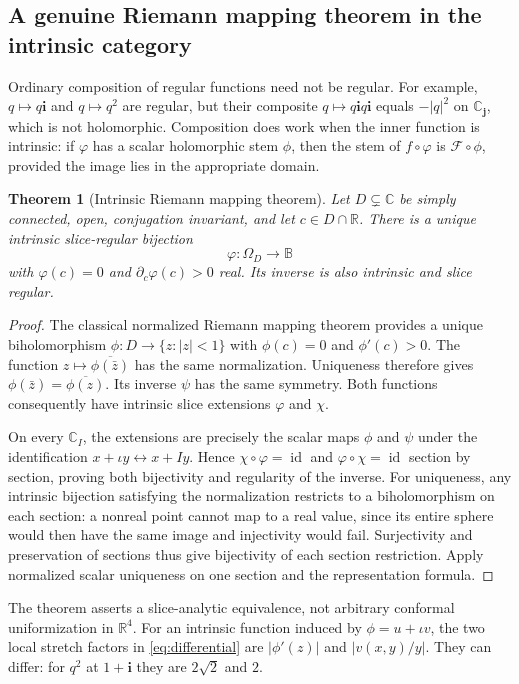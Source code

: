 \documentclass[11pt,a4paper]{article}
\numberwithin{equation}{section}
\newtheorem{theorem}{Theorem}[section]
\theoremstyle{definition}
\theoremstyle{remark}
\newcommand{\R}{\mathbb R}
\newcommand{\C}{\mathbb C}
\newcommand{\BB}{\mathbb B}
\newcommand{\ii}{\mathbf i}
\newcommand{\jj}{\mathbf j}
\newcommand{\Id}{\operatorname{id}}
\newcommand{\pc}{\partial_c}
\begin{document}
\subsection{A genuine Riemann mapping theorem in the intrinsic category}
Ordinary composition of regular functions need not be regular. For example,
$q\mapsto q\ii$ and $q\mapsto q^2$ are regular, but their composite
$q\mapsto q\ii q\ii$ equals $-|q|^2$ on $\C_{\jj}$, which is not
holomorphic. Composition does work when the inner function is intrinsic:
if $\varphi$ has a scalar holomorphic stem $\phi$, then the stem of
$f\circ\varphi$ is $\mathcal F\circ\phi$, provided the image lies in the
appropriate domain.

\begin{theorem}[Intrinsic Riemann mapping theorem]
\label{thm:riemann}
Let $D\subsetneq\C$ be simply connected, open, conjugation invariant, and
let $c\in D\cap\R$. There is a unique intrinsic slice-regular bijection
\[
 \varphi:\Omega_D\longrightarrow\BB
\]
with $\varphi(c)=0$ and $\pc\varphi(c)>0$ real. Its inverse is also intrinsic
and slice regular.
\end{theorem}
\begin{proof}
The classical normalized Riemann mapping theorem provides a unique
biholomorphism $\phi:D\to\{z:|z|<1\}$ with $\phi(c)=0$ and
$\phi'(c)>0$. The function $z\mapsto\overline{\phi(\bar z)}$ has the same
normalization. Uniqueness therefore gives
$\phi(\bar z)=\overline{\phi(z)}$.
Its inverse $\psi$ has the same symmetry. Both functions consequently have
intrinsic slice extensions $\varphi$ and $\chi$.

On every $\C_I$, the extensions are precisely the scalar maps $\phi$ and
$\psi$ under the identification $x+\iota y\leftrightarrow x+Iy$. Hence
$\chi\circ\varphi=\Id$ and $\varphi\circ\chi=\Id$ section by section,
proving both bijectivity and regularity of the inverse.
For uniqueness, any intrinsic bijection satisfying the normalization restricts
to a biholomorphism on each section: a nonreal point cannot map to a real
value, since its entire sphere would then have the same image and injectivity
would fail. Surjectivity and preservation of sections thus give bijectivity of
each section restriction. Apply normalized scalar uniqueness on one section
and the representation formula.
\end{proof}
The theorem asserts a slice-analytic equivalence, not arbitrary conformal
uniformization in $\R^4$. For an intrinsic function induced by
$\phi=u+\iota v$, the two local stretch factors in
\eqref{eq:differential} are $|\phi'(z)|$ and $|v(x,y)/y|$. They can differ:
for $q^2$ at $1+\ii$ they are $2\sqrt2$ and $2$.
\end{document}
